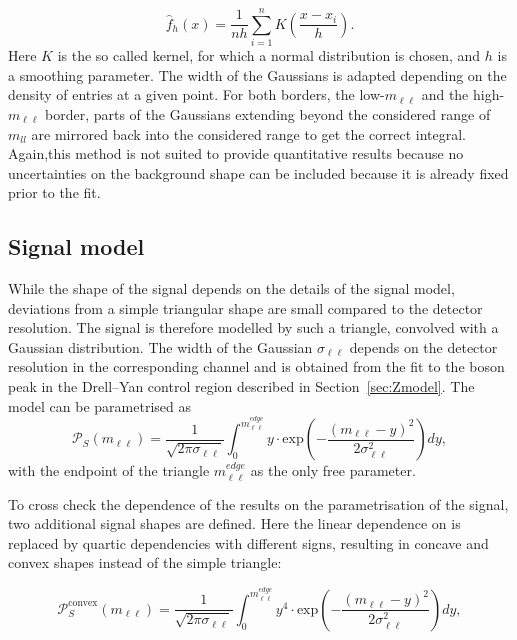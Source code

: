\begin{equation}
\hat{f}_h(x) = \frac{1}{nh}\sum\limits_{i=1}^n K(\frac{x-x_i}{h}).
\end{equation}
Here $K$ is the so called kernel, for which a normal distribution is chosen, and $h$ is a smoothing parameter\cite{kernelDensity}. The width of the Gaussians is adapted depending on the density of entries at a given point. For both borders, the low-$m_{\ell\ell}$ and the high-$m_{\ell\ell}$ border, parts of the Gaussians extending beyond the considered range of $m_{ll}$ are mirrored back into the considered range to get the correct integral. Again,this method is not suited to provide quantitative results because no uncertainties on the background shape can be included because it is already fixed prior to the fit.  



\subsection{Signal model}
\label{sec:sigModel}
While the shape of the signal depends on the details of the signal model, deviations from a simple triangular shape are small compared to the detector resolution. The signal is therefore modelled by such a triangle, convolved with a Gaussian distribution. The width of the Gaussian $\sigma_{\ell\ell}$ depends on the detector resolution in the corresponding channel and is obtained from the fit to the \Z boson peak in the Drell--Yan control region described in Section~\ref{sec:Zmodel}. The model can be parametrised as
\begin{equation}
 {\mathcal{P}}_{S}(m_{\ell\ell}) = \frac{1}{\sqrt{2\pi\sigma_{\ell\ell}}} \int_{0}^{m_{\ell\ell}^{edge}} y \cdot \textrm{exp}\left( -\frac{(m_{\ell\ell}-y)^2}{2\sigma_{\ell\ell}^{2}}\right) dy,
\end{equation}
with the endpoint of the triangle $m_{\ell\ell}^{edge}$ as the only free parameter.

To cross check the dependence of the results on the parametrisation of the signal, two additional signal shapes are defined. Here the linear dependence on \mll is replaced by quartic dependencies with different signs, resulting in concave and convex shapes instead of the simple triangle:

\begin{equation}
\label{eq:convex}
 {\mathcal{P}}^{\text{convex}}_{S}(m_{\ell\ell}) = \frac{1}{\sqrt{2\pi\sigma_{\ell\ell}}} \int_{0}^{m_{\ell\ell}^{edge}} y^4 \cdot \textrm{exp}\left( -\frac{(m_{\ell\ell}-y)^2}{2\sigma_{\ell\ell}^{2}}\right) dy,
\end{equation}

